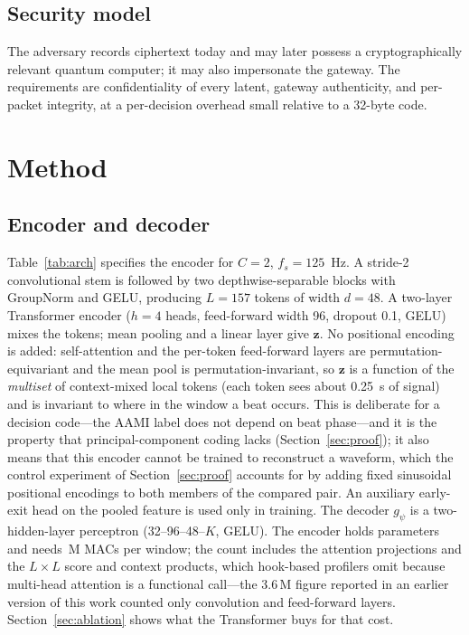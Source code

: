 \documentclass[journal]{IEEEtran}
\newcommand{\bz}{\mathbf{z}}
\begin{document}
\subsection{Security model}
The adversary records ciphertext today and may later possess a cryptographically relevant quantum computer; it may also impersonate the gateway. The requirements are confidentiality of every latent, gateway authenticity, and per-packet integrity, at a per-decision overhead small relative to a 32-byte code.

\section{Method}\label{sec:method}
\subsection{Encoder and decoder}
Table~\ref{tab:arch} specifies the encoder for $C=2$, $f_s=125$~Hz. A stride-2 convolutional stem is followed by two depthwise-separable blocks \cite{howard2017,chollet2017} with GroupNorm and GELU, producing $L=157$ tokens of width $d=48$. A two-layer Transformer encoder \cite{vaswani2017} ($h=4$ heads, feed-forward width 96, dropout 0.1, GELU) mixes the tokens; mean pooling and a linear layer give $\bz$. No positional encoding is added: self-attention and the per-token feed-forward layers are permutation-equivariant and the mean pool is permutation-invariant, so $\bz$ is a function of the \emph{multiset} of context-mixed local tokens (each token sees about 0.25~s of signal) and is invariant to where in the window a beat occurs. This is deliberate for a decision code---the AAMI label does not depend on beat phase---and it is the property that principal-component coding lacks (Section~\ref{sec:proof}); it also means that this encoder cannot be trained to reconstruct a waveform\ifhavepe, which the control experiment of Section~\ref{sec:proof} accounts for by adding fixed sinusoidal positional encodings to both members of the compared pair\fi. An auxiliary early-exit head on the pooled feature is used only in training. The decoder $g_\psi$ is a two-hidden-layer perceptron (32--96--48--$K$, GELU). The encoder holds \mainParams{} parameters and needs \mainMACs{}\,M MACs per window; the count includes the attention projections and the $L\times L$ score and context products, which hook-based profilers omit because multi-head attention is a functional call---the 3.6\,M figure reported in an earlier version of this work counted only convolution and feed-forward layers. Section~\ref{sec:ablation} shows what the Transformer buys for that cost.
\end{document}
